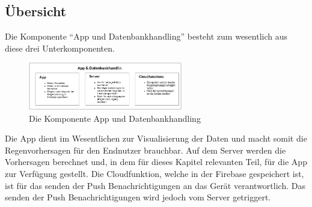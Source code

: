 \subsection{Übersicht}\label{übersicht}
Die Komponente “App und Datenbankhandling” besteht zum wesentlich aus diese drei Unterkomponenten.  

\begin{figure}[h]
 \centering
 \includegraphics[width=0.6\textwidth,angle=0]{abb/app_datenbank_komponente_uebersicht}
 \caption[Komponentenübersicht App und Datenbankhandling]{Die Komponente App und Datenbankhandling}
\label{fig:Beschreibung}
\end{figure}

Die App dient im Wesentlichen zur Visualisierung der Daten und macht somit die Regenvorhersagen für den Endnutzer brauchbar. Auf dem Server werden die Vorhersagen berechnet und, in dem für dieses Kapitel relevanten Teil, für die App zur Verfügung gestellt. Die Cloudfunktion, welche in der Firebase gespeichert ist, ist für das senden der Push Benachrichtigungen an das Gerät verantwortlich. Das senden der Push Benachrichtigungen wird jedoch vom Server getriggert.  